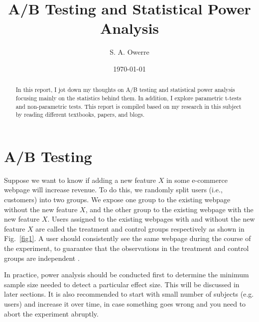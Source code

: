 \documentclass[10pt, aps,twocolumn, superscriptaddress, nofootinbib]{revtex4-2}
\begin{document}
\date{\today}
\title{A/B Testing and Statistical Power Analysis}
\author{S. A. Owerre}

\begin{abstract}
In this  report, I jot down my  thoughts on A/B testing and statistical power analysis focusing mainly on the statistics behind them. In addition, I explore parametric t-tests and non-parametric tests.  This report is compiled  based on my research in this subject by reading different textbooks, papers, and blogs. 
\end{abstract}

\maketitle

\section{A/B Testing}

Suppose we want to know if adding a new feature $X$ in some e-commerce webpage will increase revenue. To do this, we randomly split users (i.e., customers) into two groups. We expose one group to the existing webpage without the new feature $X$, and the other group to the existing webpage with the new feature $X$.  Users assigned to the existing webpages with and without the new feature $X$ are called the treatment and control groups respectively as shown in Fig.~\eqref{fig1}. A user should consistently see the same webpage during the course of the experiment, to guarantee that the observations in the treatment and control groups are independent \cite{s1}.

In practice, power analysis should be conducted first to determine the minimum sample size needed to detect a particular effect size. This will be discussed in later sections. It is also recommended to start with small number of subjects (e.g. users) and increase it over time, in case something goes wrong and you need to abort the experiment abruptly. 
\end{document}
